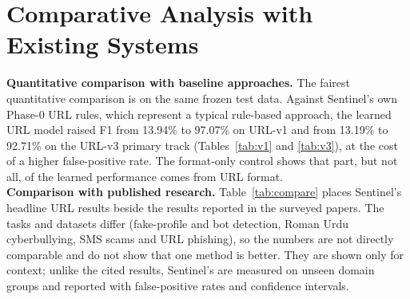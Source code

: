 \section{Comparative Analysis with Existing Systems}
\noindent\textbf{Quantitative comparison with baseline approaches.} The fairest quantitative comparison is on the same frozen test data. Against Sentinel's own Phase-0 URL rules, which represent a typical rule-based approach, the learned URL model raised F1 from 13.94\% to 97.07\% on URL-v1 and from 13.19\% to 92.71\% on the URL-v3 primary track (Tables~\ref{tab:v1} and \ref{tab:v3}), at the cost of a higher false-positive rate. The format-only control shows that part, but not all, of the learned performance comes from URL format.\\

\noindent\textbf{Comparison with published research.} Table~\ref{tab:compare} places Sentinel's headline URL results beside the results reported in the surveyed papers. The tasks and datasets differ (fake-profile and bot detection, Roman Urdu cyberbullying, SMS scams and URL phishing), so the numbers are not directly comparable and do not show that one method is better. They are shown only for context; unlike the cited results, Sentinel's are measured on unseen domain groups and reported with false-positive rates and confidence intervals.

